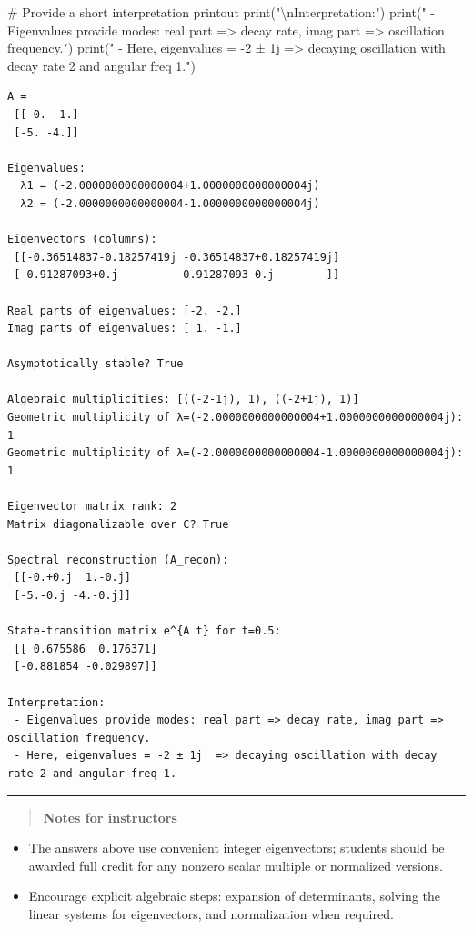 \documentclass[
  letterpaper,
  DIV=11,
  numbers=noendperiod]{scrreprt}
\newenvironment{Shaded}{\begin{snugshade}}{\end{snugshade}}
\newcommand{\BuiltInTok}[1]{\textcolor[rgb]{0.00,0.23,0.31}{#1}}
\newcommand{\CharTok}[1]{\textcolor[rgb]{0.13,0.47,0.30}{#1}}
\newcommand{\CommentTok}[1]{\textcolor[rgb]{0.37,0.37,0.37}{#1}}
\newcommand{\NormalTok}[1]{\textcolor[rgb]{0.00,0.23,0.31}{#1}}
\newcommand{\StringTok}[1]{\textcolor[rgb]{0.13,0.47,0.30}{#1}}
\providecommand{\tightlist}{%
  \setlength{\itemsep}{0pt}\setlength{\parskip}{0pt}}
\begin{document}
\begin{Shaded}
\begin{Highlighting}[]
\CommentTok{\# Provide a short interpretation printout}
\BuiltInTok{print}\NormalTok{(}\StringTok{"}\CharTok{\textbackslash{}n}\StringTok{Interpretation:"}\NormalTok{)}
\BuiltInTok{print}\NormalTok{(}\StringTok{" {-} Eigenvalues provide modes: real part =\textgreater{} decay rate, imag part =\textgreater{} oscillation frequency."}\NormalTok{)}
\BuiltInTok{print}\NormalTok{(}\StringTok{" {-} Here, eigenvalues = {-}2 ± 1j  =\textgreater{} decaying oscillation with decay rate 2 and angular freq 1."}\NormalTok{)}
\end{Highlighting}
\end{Shaded}

\begin{verbatim}
A =
 [[ 0.  1.]
 [-5. -4.]]

Eigenvalues:
  λ1 = (-2.0000000000000004+1.0000000000000004j)
  λ2 = (-2.0000000000000004-1.0000000000000004j)

Eigenvectors (columns):
 [[-0.36514837-0.18257419j -0.36514837+0.18257419j]
 [ 0.91287093+0.j          0.91287093-0.j        ]]

Real parts of eigenvalues: [-2. -2.]
Imag parts of eigenvalues: [ 1. -1.]

Asymptotically stable? True

Algebraic multiplicities: [((-2-1j), 1), ((-2+1j), 1)]
Geometric multiplicity of λ=(-2.0000000000000004+1.0000000000000004j): 1
Geometric multiplicity of λ=(-2.0000000000000004-1.0000000000000004j): 1

Eigenvector matrix rank: 2
Matrix diagonalizable over C? True

Spectral reconstruction (A_recon):
 [[-0.+0.j  1.-0.j]
 [-5.-0.j -4.-0.j]]

State-transition matrix e^{A t} for t=0.5:
 [[ 0.675586  0.176371]
 [-0.881854 -0.029897]]

Interpretation:
 - Eigenvalues provide modes: real part => decay rate, imag part => oscillation frequency.
 - Here, eigenvalues = -2 ± 1j  => decaying oscillation with decay rate 2 and angular freq 1.
\end{verbatim}

\begin{center}\rule{0.5\linewidth}{0.5pt}\end{center}

\begin{quote}
\textbf{Notes for instructors}
\end{quote}

\begin{itemize}
\tightlist
\item
  The answers above use convenient integer eigenvectors; students should
  be awarded full credit for any nonzero scalar multiple or normalized
  versions.
\item
  Encourage explicit algebraic steps: expansion of determinants, solving
  the linear systems for eigenvectors, and normalization when required.
\end{itemize}
\end{document}
